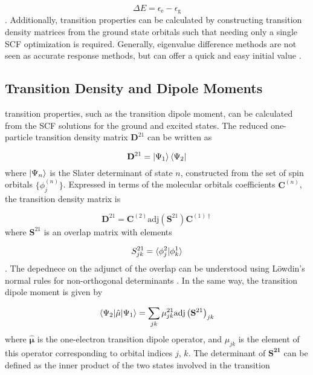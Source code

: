 \begin{equation}
\Delta E = \epsilon_{\text{e}} - \epsilon_{\text{g}}
\end{equation}
%
. Additionally, transition properties can be calculated by constructing transition 
density matrices from the ground state orbitals such that needing only a single 
SCF optimization is required. Generally, eigenvalue difference methods are not 
seen as accurate response methods, but can offer a quick and easy initial value 
\cite{Gimon2009}.

\subsection{Transition Density and Dipole Moments}
\label{subsec:dscf_transition_density}
\dscf transition properties, such as the transition dipole moment, can be calculated from
the SCF solutions for the ground and excited states. The reduced one-particle transition
density matrix $\mathbf{D}^{21}$ can be written as

\begin{equation}
\mathbf{D}^{21} = \ket{\Psi_1} \bra{\Psi_2}
\end{equation}
%
where $\ket{\Psi_n}$ is the Slater determinant of state $n$, constructed from the
set of spin orbitals $\{ \phi_{j}^{\left(n\right)} \} $. Expressed 
in terms of the molecular orbitals coefficients $\mathbf{C}^{\left(n\right)}$, the
transition density matrix is

\begin{equation}
\mathbf{D}^{21} = \mathbf{C}^{\left(2\right)} \text{adj}\left(\mathbf{S}^{21}\right) \mathbf{C}^{\left(1\right) \dagger}
\end{equation}
%
where $\mathbf{S}^{21}$ is an overlap matrix with elements 

\begin{equation}
S^{21}_{jk} = \braket{\phi^2_j|\phi^1_k}
\end{equation}
%
. The depednece on the adjunct of the overlap
can be understood using L{\"o}wdin's normal rules for non-orthogonal determinants \cite{Lowdin1955}.
In the same way, the transition dipole moment is given by

\begin{equation}
\braket{\Psi_2|\hat{\mathbf{\mu}}|\Psi_1} = \sum_{jk} \mathbf{\mu}_{jk}^{21} \text{adj} \left( \mathbf{S}^{21}\right)_{jk}
\end{equation}
%
where $\hat{\mathbf{\mu}}$ is the one-electron transition dipole operator, and
$\mu_{jk}$ is the element of this operator corresponding to orbital indices $j$, $k$.
The determinant of $\mathbf{S^{21}}$ can be defined as the inner product of the 
two states involved in the transition

